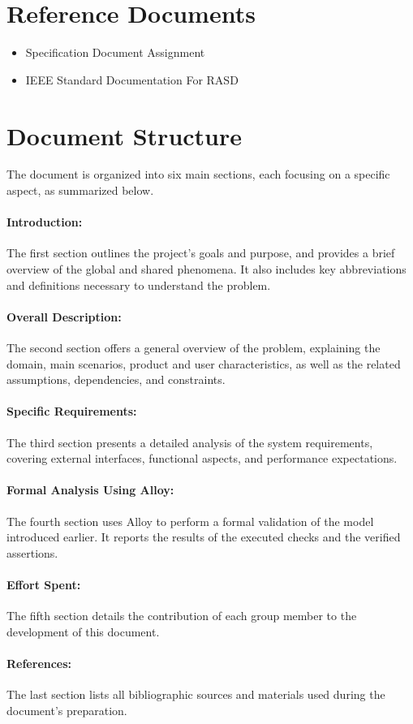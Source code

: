 \section{Reference Documents}
\label{sec:reference_documents}%
\begin{itemize}
    \item Specification Document Assignment
    \item IEEE Standard Documentation For RASD 
\end{itemize}

\newpage

\section{Document Structure}
\label{sec:document_structure}%
The document is organized into six main sections, each focusing on a specific aspect, as summarized below.
\paragraph{Introduction:} The first section outlines the project’s goals and purpose, and provides a brief overview of the global and shared phenomena. It also includes key abbreviations and definitions necessary to understand the problem.
\paragraph{Overall Description:} The second section offers a general overview of the problem, explaining the domain, main scenarios, product and user characteristics, as well as the related assumptions, dependencies, and constraints.
\paragraph{Specific Requirements:} The third section presents a detailed analysis of the system requirements, covering external interfaces, functional aspects, and performance expectations.
\paragraph{Formal Analysis Using Alloy:} The fourth section uses Alloy to perform a formal validation of the model introduced earlier. It reports the results of the executed checks and the verified assertions.
\paragraph{Effort Spent:} The fifth section details the contribution of each group member to the development of this document.
\paragraph{References:} The last section lists all bibliographic sources and materials used during the document’s preparation.


